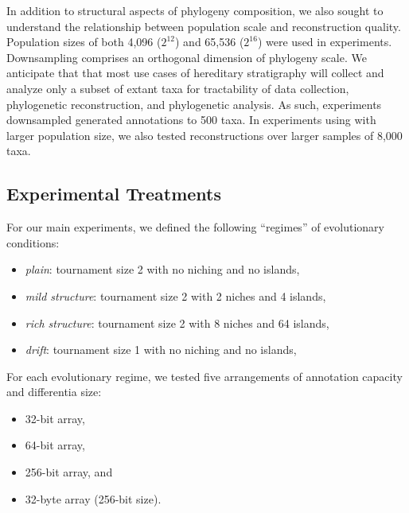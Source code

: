In addition to structural aspects of phylogeny composition, we also sought to understand the relationship between population scale and reconstruction quality.
Population sizes of both 4,096 ($2^{12}$) and 65,536 ($2^{16}$) were used in experiments.
Downsampling comprises an orthogonal dimension of phylogeny scale.
We anticipate that that most use cases of hereditary stratigraphy will collect and analyze only a subset of extant taxa for tractability of data collection, phylogenetic reconstruction, and phylogenetic analysis.
As such, experiments downsampled generated annotations to 500 taxa.
In experiments using with larger population size, we also tested reconstructions over larger samples of 8,000 taxa.

\subsection{Experimental Treatments}

For our main experiments, we defined the following ``regimes'' of evolutionary conditions:
\begin{itemize}
  \item \textit{plain}: tournament size 2 with no niching and no islands,
  \item \textit{mild structure}: tournament size 2 with 2 niches and 4 islands,
  \item \textit{rich structure}: tournament size 2 with 8 niches and 64 islands,
  \item \textit{drift}: tournament size 1 with no niching and no islands,
\end{itemize}



For each evolutionary regime, we tested five arrangements of annotation capacity and differentia size:
\begin{itemize}
  \item 32-bit array,
  \item 64-bit array,
  \item 256-bit array, and
  \item 32-byte array (256-bit size).
\end{itemize}

